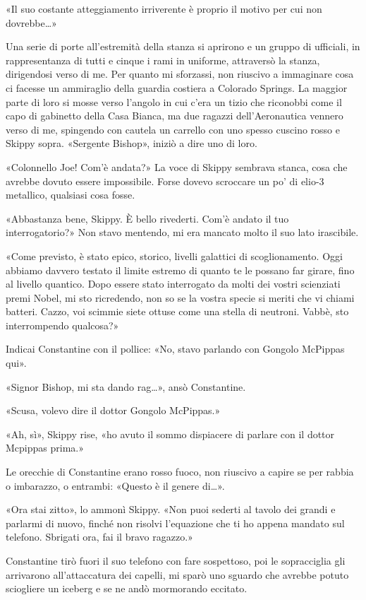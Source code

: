 «Il suo costante atteggiamento irriverente è proprio il motivo per cui
non dovrebbe\ldots»

Una serie di porte all'estremità della stanza si aprirono e un gruppo di
ufficiali, in rappresentanza di tutti e cinque i rami in uniforme,
attraversò la stanza, dirigendosi verso di me. Per quanto mi sforzassi,
non riuscivo a immaginare cosa ci facesse un ammiraglio della guardia
costiera a Colorado Springs. La maggior parte di loro si mosse verso
l'angolo in cui c'era un tizio che riconobbi come il capo di gabinetto
della Casa Bianca, ma due ragazzi dell'Aeronautica vennero verso di me,
spingendo con cautela un carrello con uno spesso cuscino rosso e Skippy
sopra. «Sergente Bishop», iniziò a dire uno di loro.

«Colonnello Joe! Com'è andata?» La voce di Skippy sembrava stanca, cosa
che avrebbe dovuto essere impossibile. Forse dovevo scroccare un po' di
elio-3 metallico, qualsiasi cosa fosse.

«Abbastanza bene, Skippy. È bello rivederti. Com'è andato il tuo
interrogatorio?» Non stavo mentendo, mi era mancato molto il suo lato
irascibile.

«Come previsto, è stato epico, storico, livelli galattici di
scoglionamento. Oggi abbiamo davvero testato il limite estremo di quanto
te le possano far girare, fino al livello quantico. Dopo essere stato
interrogato da molti dei vostri scienziati premi Nobel, mi sto
ricredendo, non so se la vostra specie si meriti che vi chiami batteri.
Cazzo, voi scimmie siete ottuse come una stella di neutroni. Vabbè, sto
interrompendo qualcosa?»

Indicai Constantine con il pollice: «No, stavo parlando con Gongolo
McPippas qui».

«Signor Bishop, mi sta dando rag\ldots», ansò Constantine.

«Scusa, volevo dire il dottor Gongolo McPippas.»

«Ah, sì», Skippy rise, «ho avuto il sommo dispiacere di parlare con il
dottor Mcpippas prima.»

Le orecchie di Constantine erano rosso fuoco, non riuscivo a capire se
per rabbia o imbarazzo, o entrambi: «Questo è il genere di\ldots».

«Ora stai zitto», lo ammonì Skippy. «Non puoi sederti al tavolo dei
grandi e parlarmi di nuovo, finché non risolvi l'equazione che ti ho
appena mandato sul telefono. Sbrigati ora, fai il bravo ragazzo.»

Constantine tirò fuori il suo telefono con fare sospettoso, poi le
sopracciglia gli arrivarono all'attaccatura dei capelli, mi sparò uno
sguardo che avrebbe potuto sciogliere un iceberg e se ne andò mormorando
eccitato.

